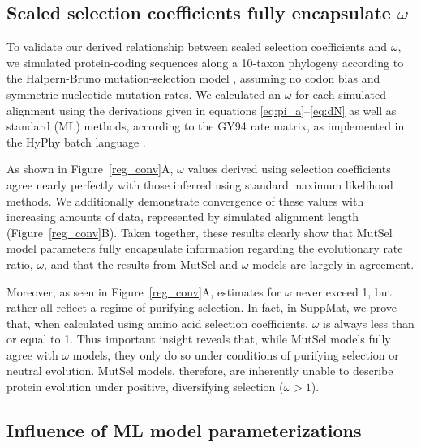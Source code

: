 \documentclass[11pt]{article}
\begin{document}
\subsection*{Scaled selection coefficients fully encapsulate $\omega$}

To validate our derived relationship between scaled selection coefficients and $\omega$, we simulated protein-coding sequences along a 10-taxon phylogeny according to the Halpern-Bruno mutation-selection model \cite{HalpernBruno1998}, assuming no codon bias and symmetric nucleotide mutation rates. We calculated an $\omega$ for each simulated alignment using the derivations given in equations \eqref{eq:pi_a}--\eqref{eq:dN} as well as standard (ML) methods, according to the GY94 \cite{GoldmanYang1994} rate matrix, as implemented in the HyPhy batch language \cite{KosakovskyPondetal2005}.

As shown in Figure~\ref{reg_conv}A, $\omega$ values derived using selection coefficients agree nearly perfectly with those inferred using standard maximum likelihood methods. We additionally demonstrate convergence of these values with increasing amounts of data, represented by simulated alignment length (Figure~\ref{reg_conv}B). Taken together, these results clearly show that MutSel model parameters fully encapsulate information regarding the evolutionary rate ratio, $\omega$, and that the results from MutSel and $\omega$ models are largely in agreement. 

Moreover, as seen in Figure~\ref{reg_conv}A, estimates for $\omega$ never exceed 1, but rather all reflect a regime of purifying selection. In fact, in SuppMat, we prove that, when calculated using amino acid selection coefficients, $\omega$ is always less than or equal to 1. Thus important insight reveals that, while MutSel models fully agree with $\omega$ models, they only do so under conditions of purifying selection or neutral evolution. MutSel models, therefore, are inherently unable to describe protein evolution under positive, diversifying selection ($\omega > 1$).



\subsection*{Influence of ML model parameterizations}
\end{document}
